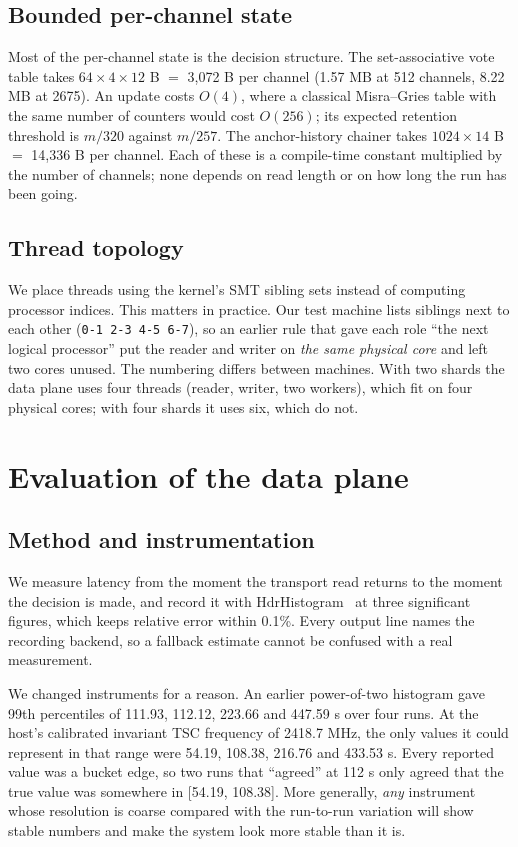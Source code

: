 \documentclass[conference]{IEEEtran}
\begin{document}
\subsection{Bounded per-channel state}

Most of the per-channel state is the decision structure. The set-associative vote table takes
$64 \times 4 \times 12$ B $=$ 3,072 B per channel (1.57 MB at 512 channels, 8.22 MB at 2675).
An update costs $O(4)$, where a classical Misra--Gries table with the same number of counters
would cost $O(256)$; its expected retention threshold is $m/320$ against $m/257$. The
anchor-history chainer takes $1024 \times 14$ B $=$ 14,336 B per channel. Each of these is a
compile-time constant multiplied by the number of channels; none depends on read length or on
how long the run has been going.

\subsection{Thread topology}

We place threads using the kernel's SMT sibling sets instead of computing processor indices.
This matters in practice. Our test machine lists siblings next to each other
(\texttt{0-1 2-3 4-5 6-7}), so an earlier rule that gave each role ``the next logical
processor'' put the reader and writer on \emph{the same physical core} and left two cores
unused. The numbering differs between machines. With two shards the data plane uses four
threads (reader, writer, two workers), which fit on four physical cores; with four shards it
uses six, which do not.

\section{Evaluation of the data plane}
\label{sec:eval}

\subsection{Method and instrumentation}

We measure latency from the moment the transport read returns to the moment the decision is
made, and record it with HdrHistogram~\cite{hdrhistogram} at three significant figures, which
keeps relative error within 0.1\%. Every output line names the recording backend, so a fallback
estimate cannot be confused with a real measurement.

We changed instruments for a reason. An earlier power-of-two histogram gave 99th percentiles of
111.93, 112.12, 223.66 and 447.59 \textmu{}s over four runs. At the host's calibrated invariant
TSC frequency of 2418.7 MHz, the only values it could represent in that range were 54.19,
108.38, 216.76 and 433.53 \textmu{}s. Every reported value was a bucket edge, so two runs that
``agreed'' at 112 \textmu{}s only agreed that the true value was somewhere in [54.19, 108.38].
More generally, \emph{any} instrument whose resolution is coarse compared with the run-to-run
variation will show stable numbers and make the system look more stable than it is.
\end{document}
